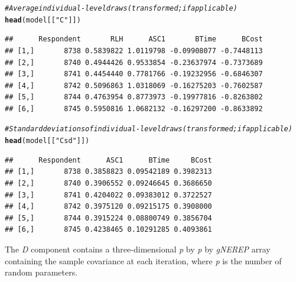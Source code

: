\documentclass{article}\usepackage[]{graphicx}\usepackage[]{color}
\makeatletter
\newcommand{\hlstr}[1]{\textcolor[rgb]{0.192,0.494,0.8}{#1}}%
\newcommand{\hlcom}[1]{\textcolor[rgb]{0.678,0.584,0.686}{\textit{#1}}}%
\newcommand{\hlstd}[1]{\textcolor[rgb]{0.345,0.345,0.345}{#1}}%
\newcommand{\hlkwd}[1]{\textcolor[rgb]{0.737,0.353,0.396}{\textbf{#1}}}%
\newenvironment{kframe}{%
 \def\at@end@of@kframe{}%
 \ifinner\ifhmode%
  \def\at@end@of@kframe{\end{minipage}}%
  \begin{minipage}{\columnwidth}%
 \fi\fi%
 \def\FrameCommand##1{\hskip\@totalleftmargin \hskip-\fboxsep
 \colorbox{shadecolor}{##1}\hskip-\fboxsep
     \hskip-\linewidth \hskip-\@totalleftmargin \hskip\columnwidth}%
 \MakeFramed {\advance\hsize-\width
   \@totalleftmargin\z@ \linewidth\hsize
   \@setminipage}}%
 {\par\unskip\endMakeFramed%
 \at@end@of@kframe}
\newenvironment{knitrout}{}{} %
\makeatother
\begin{document}
\begin{knitrout}
\color{fgcolor}\begin{kframe}
\begin{alltt}
\hlcom{# Average individual-level draws (transformed; if applicable)}
\hlkwd{head}\hlstd{(model[[}\hlstr{"C"}\hlstd{]])}
\end{alltt}
\begin{verbatim}
##      Respondent       RLH      ASC1       BTime      BCost
## [1,]       8738 0.5839822 1.0119798 -0.09908077 -0.7448113
## [2,]       8740 0.4944426 0.9533854 -0.23637974 -0.7373689
## [3,]       8741 0.4454440 0.7781766 -0.19232956 -0.6846307
## [4,]       8742 0.5096863 1.0318069 -0.16275203 -0.7602587
## [5,]       8744 0.4763954 0.8773973 -0.19977816 -0.8263802
## [6,]       8745 0.5950816 1.0682132 -0.16297200 -0.8633892
\end{verbatim}
\begin{alltt}
\hlcom{# Standard deviations of individual-level draws (transformed; if applicable)}
\hlkwd{head}\hlstd{(model[[}\hlstr{"Csd"}\hlstd{]])}
\end{alltt}
\begin{verbatim}
##      Respondent      ASC1      BTime     BCost
## [1,]       8738 0.3858823 0.09542189 0.3982313
## [2,]       8740 0.3906552 0.09246645 0.3686650
## [3,]       8741 0.4204022 0.09383012 0.3722527
## [4,]       8742 0.3975120 0.09215175 0.3908000
## [5,]       8744 0.3915224 0.08800749 0.3856704
## [6,]       8745 0.4238465 0.10291285 0.4093861
\end{verbatim}
\end{kframe}
\end{knitrout}


The \emph{D} component contains a three-dimensional \emph{p} by \emph{p} by \emph{gNEREP} array containing the sample covariance at each iteration, where \emph{p} is the number of random parameters.   
\end{document}
